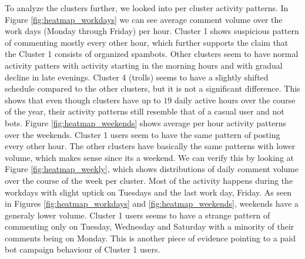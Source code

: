 \documentclass[11pt,a4paper]{article}
\begin{document}
To analyze the clusters further, we looked into per cluster activity patterns. In Figure \ref{fig:heatmap_workdays} we can see average comment volume over the work days (Monday through Friday) per hour. Cluster 1 shows suspicious pattern of commenting mostly every other hour, which further supports the claim that the Cluster 1 consists of organized spambots. Other clusters seem to have normal activity patters with activity starting in the morning hours and with gradual decline in late evenings. Cluster 4 (trolls) seems to have a slightly shifted schedule compared to the other clusters, but it is not a significant difference. This shows that even though clusters have up to $19$ daily active hours over the course of the year, their activity patterns still resemble that of a casual user and not bots. Figure \ref{fig:heatmap_weekends} shows average per hour activity patterns over the weekends. Cluster 1 users seem to have the same pattern of posting every other hour. The other clusters have basically the same patterns with lower volume, which makes sense since its a weekend. We can verify this by looking at Figure \ref{fig:heatmap_weekly}, which shows distributions of daily comment volume over the course of the week per cluster. Most of the activity happens during the workdays with slight uptick on Tuesdays and the last work day, Friday. As seen in Figures \ref{fig:heatmap_workdays} and \ref{fig:heatmap_weekends}, weekends have a generaly lower volume. Cluster 1 users seems to have a strange pattern of commenting only on Tuesday, Wednesday and Saturday with a minority of their comments being on Monday. This is another piece of evidence pointing to a paid bot campaign behaviour of Cluster 1 users.
\end{document}
